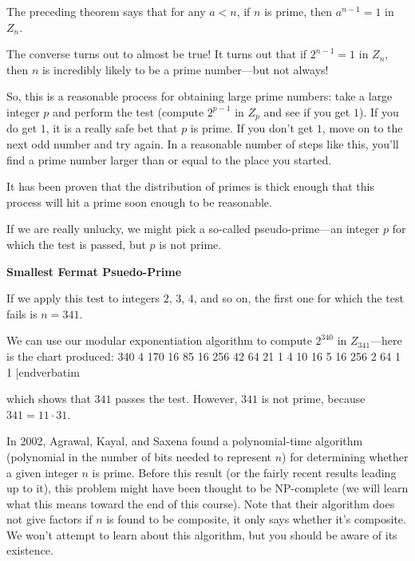 The preceding theorem says that for any $a < n$, if $n$ is prime, then
$ a^{n-1} = 1$ in $Z_n$.
\medskip

The converse turns out to almost be true!  It turns out that if $ 2^{n-1} = 1$ in $Z_n$, then
$n$ is incredibly likely to be a prime number---but not always!
\medskip

\In
   So, this is a reasonable process for obtaining large prime numbers:  take a large integer
   $p$ and
   perform the test (compute $2^{p-1}$ in $Z_p$ and see if you get $1$).  If you do get $1$,
   it is a really safe bet that $p$ is prime.  If you don't get $1$, move on to the next odd number
   and try again.  In a reasonable number of steps like this, you'll find a prime number larger
   than or equal to the place you started.
   \medskip
   
   It has been proven that the distribution of primes is thick enough that this
   process will hit a prime soon enough to be reasonable.
   \medskip
   
   If we are really unlucky, we might pick a so-called pseudo-prime---an integer $p$
   for which the test is passed, but $p$ is not prime.
\border

{\bf Smallest Fermat Psuedo-Prime}
\medskip

If we apply this test to integers $2$, $3$, $4$, and so on, the first one for which the test fails is
$n=341$.
\medskip

We can use our modular exponentiation algorithm to compute $2^{340}$ in $Z_{341}$---here is the
chart produced:
\medskip
{}             340
              4             170
             16              85              16
            256              42
             64              21               1
              4              10
             16               5              16
            256               2
             64               1               1
|endverbatim

which shows that $341$ passes the test.
However, $341$ is not prime, because $341 = 11 \cdot 31$.
\border

   In 2002, Agrawal, Kayal, and Saxena found a polynomial-time algorithm (polynomial
   in the
   number of bits needed to represent $n$) for determining whether a given integer $n$ is prime.
   Before this result (or the fairly recent results leading up to it), this problem might have been
    thought
   to be NP-complete (we will learn what this means toward the end of this course).
   Note that their algorithm does not give factors if $n$ is found to be composite, it only
   says whether it's composite.  We won't attempt to learn about this algorithm, but you
   should be aware of its existence.
\border
\Outdent

